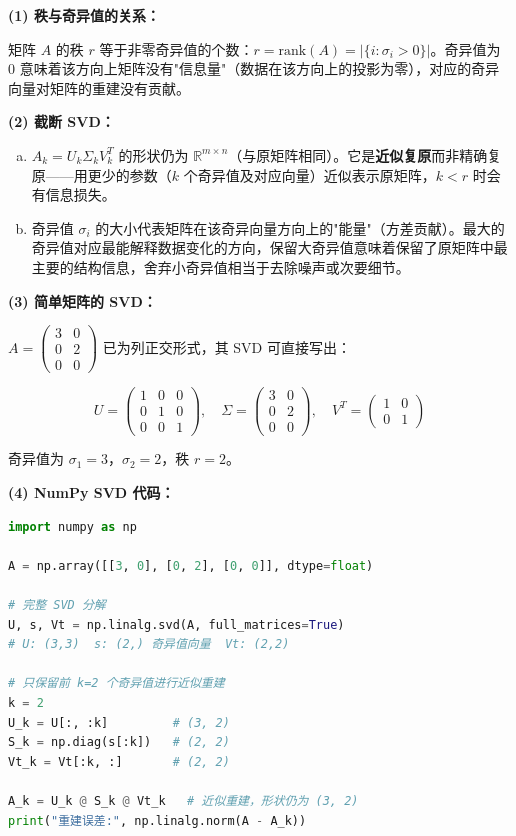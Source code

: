 \documentclass[a4paper,11pt]{ctexart}
\begin{document}
\begin{solutionbox}[参考答案与详细解析]
    \textbf{(1) 秩与奇异值的关系：}

    矩阵 $A$ 的秩 $r$ 等于非零奇异值的个数：$r = \text{rank}(A) = |\{i : \sigma_i > 0\}|$。奇异值为 0 意味着该方向上矩阵没有"信息量"（数据在该方向上的投影为零），对应的奇异向量对矩阵的重建没有贡献。

    \textbf{(2) 截断 SVD：}

    \begin{enumerate}[a.]
        \item $A_k = U_k \Sigma_k V_k^T$ 的形状仍为 $\mathbb{R}^{m \times n}$（与原矩阵相同）。它是\textbf{近似复原}而非精确复原——用更少的参数（$k$ 个奇异值及对应向量）近似表示原矩阵，$k < r$ 时会有信息损失。
        \item 奇异值 $\sigma_i$ 的大小代表矩阵在该奇异向量方向上的"能量"（方差贡献）。最大的奇异值对应最能解释数据变化的方向，保留大奇异值意味着保留了原矩阵中最主要的结构信息，舍弃小奇异值相当于去除噪声或次要细节。
    \end{enumerate}

    \textbf{(3) 简单矩阵的 SVD：}

    $A = \begin{pmatrix} 3 & 0 \\ 0 & 2 \\ 0 & 0 \end{pmatrix}$ 已为列正交形式，其 SVD 可直接写出：

    \[
    U = \begin{pmatrix} 1 & 0 & 0 \\ 0 & 1 & 0 \\ 0 & 0 & 1 \end{pmatrix},\quad
    \Sigma = \begin{pmatrix} 3 & 0 \\ 0 & 2 \\ 0 & 0 \end{pmatrix},\quad
    V^T = \begin{pmatrix} 1 & 0 \\ 0 & 1 \end{pmatrix}
    \]

    奇异值为 $\sigma_1 = 3$，$\sigma_2 = 2$，秩 $r = 2$。

    \textbf{(4) NumPy SVD 代码：}

    \begin{lstlisting}[language=Python]
import numpy as np

A = np.array([[3, 0], [0, 2], [0, 0]], dtype=float)

# 完整 SVD 分解
U, s, Vt = np.linalg.svd(A, full_matrices=True)
# U: (3,3)  s: (2,) 奇异值向量  Vt: (2,2)

# 只保留前 k=2 个奇异值进行近似重建
k = 2
U_k = U[:, :k]         # (3, 2)
S_k = np.diag(s[:k])   # (2, 2)
Vt_k = Vt[:k, :]       # (2, 2)

A_k = U_k @ S_k @ Vt_k   # 近似重建，形状仍为 (3, 2)
print("重建误差:", np.linalg.norm(A - A_k))
    \end{lstlisting}
\end{solutionbox}
\end{document}
